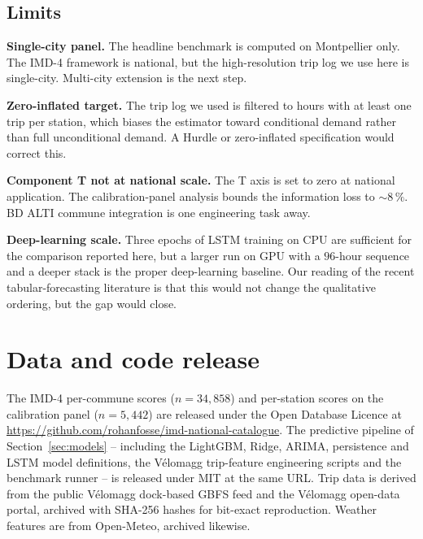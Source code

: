 \documentclass[11pt,a4paper]{article}
\begin{document}
\subsection{Limits}

\textbf{Single-city panel.}  The headline benchmark is computed
on Montpellier only.  The IMD-4 framework is national, but the
high-resolution trip log we use here is single-city.  Multi-city
extension is the next step.

\textbf{Zero-inflated target.}  The trip log we used is filtered
to hours with at least one trip per station, which biases the
estimator toward conditional demand rather than full unconditional
demand.  A Hurdle or zero-inflated specification would correct
this.

\textbf{Component T not at national scale.}  The T axis is set to
zero at national application.  The calibration-panel analysis
bounds the information loss to $\sim 8\,\%$.  BD ALTI commune
integration is one engineering task away.

\textbf{Deep-learning scale.}  Three epochs of LSTM training on
CPU are sufficient for the comparison reported here, but a
larger run on GPU with a $96$-hour sequence and a deeper stack is
the proper deep-learning baseline.  Our reading of the recent
tabular-forecasting literature \citep{Grinsztajn2022} is that
this would not change the qualitative ordering, but the gap
would close.

\section{Data and code release}
\label{sec:data-release}

The IMD-4 per-commune scores ($n = 34{,}858$) and per-station
scores on the calibration panel ($n = 5{,}442$) are released
under the Open Database Licence at
\url{https://github.com/rohanfosse/imd-national-catalogue}.
The predictive pipeline of Section~\ref{sec:models} -- including
the LightGBM, Ridge, ARIMA, persistence and LSTM model
definitions, the V\'elomagg trip-feature engineering scripts and
the benchmark runner -- is released under MIT at the same URL.
Trip data is derived from the public V\'elomagg dock-based GBFS
feed and the V\'elomagg open-data portal, archived with
SHA-256 hashes for bit-exact reproduction.  Weather features are
from Open-Meteo, archived likewise.

\end{document}
